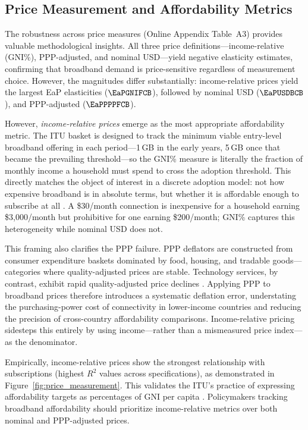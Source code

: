 \subsection{Price Measurement and Affordability Metrics}

The robustness across price measures (Online Appendix Table~A3) provides valuable methodological insights. All three price definitions---income-relative (GNI\%), PPP-adjusted, and nominal USD---yield negative elasticity estimates, confirming that broadband demand is price-sensitive regardless of measurement choice. However, the magnitudes differ substantially: income-relative prices yield the largest EaP elasticities ($\EaPGNIFCB$), followed by nominal USD ($\EaPUSDBCB$), and PPP-adjusted ($\EaPPPPFCB$).

However, \textit{income-relative prices} emerge as the most appropriate affordability metric. The ITU basket is designed to track the minimum viable entry-level broadband offering in each period---1\,GB in the early years, 5\,GB once that became the prevailing threshold---so the GNI\% measure is literally the fraction of monthly income a household must spend to cross the adoption threshold. This directly matches the object of interest in a discrete adoption model: not how expensive broadband is in absolute terms, but whether it is affordable enough to subscribe at all \citep{deaton1980almost}. A \$30/month connection is inexpensive for a household earning \$3{,}000/month but prohibitive for one earning \$200/month; GNI\% captures this heterogeneity while nominal USD does not.

This framing also clarifies the PPP failure. PPP deflators are constructed from consumer expenditure baskets dominated by food, 
housing, and tradable goods---categories where quality-adjusted prices are stable. 
Technology services, by contrast, exhibit rapid quality-adjusted price declines \citep{schreyer2002oecd}. 
Applying PPP to broadband prices therefore introduces a systematic deflation error, 
understating the purchasing-power cost of connectivity in lower-income countries and 
reducing the precision of cross-country affordability comparisons. 
Income-relative pricing sidesteps this entirely by using income---rather than a mismeasured price index---as the denominator.

Empirically, income-relative prices show the strongest relationship with subscriptions (highest $R^2$ values across specifications), 
as demonstrated in Figure~\ref{fig:price_measurement}. This validates the ITU's practice of expressing 
affordability targets as percentages of GNI per capita \citep{itu2024data}. Policymakers tracking broadband affordability 
should prioritize income-relative metrics over both nominal and PPP-adjusted prices.

